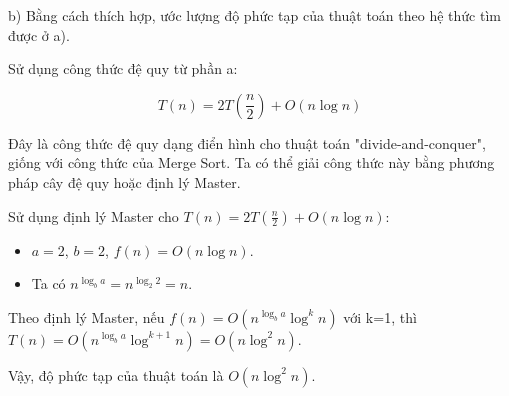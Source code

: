 \documentclass[12pt,a4paper]{article}
\begin{document}
b) Bằng cách thích hợp, ước lượng độ phức tạp của thuật toán theo hệ thức tìm được ở a).

Sử dụng công thức đệ quy từ phần a:

\[
T(n) = 2T\left(\frac{n}{2}\right) + O(n\log n)
\]

Đây là công thức đệ quy dạng điển hình cho thuật toán "divide-and-conquer", giống với công thức của Merge Sort. Ta có thể giải công thức này bằng phương pháp cây đệ quy hoặc định lý Master.

Sử dụng định lý Master cho \( T(n) = 2T\left(\frac{n}{2}\right) + O(n\log n) \):

\begin{itemize}
    \item \( a = 2 \), \( b = 2 \), \( f(n) = O(n\log n) \).
    \item Ta có \( n^{\log_b a} = n^{\log_2 2} = n \).
\end{itemize}

Theo định lý Master, nếu \( f(n) = O(n^{\log_b a}\log^k n) \) với k=1, thì \( T(n) = O(n^{\log_b a} \log^{k+1} n) = O(n \log^2 n) \).

Vậy, độ phức tạp của thuật toán là \( O(n \log^2 n) \).
\end{document}
